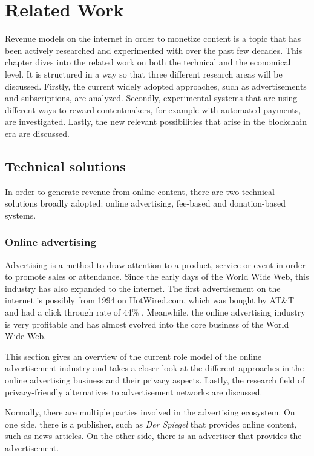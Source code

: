 \chapter{Related Work}
\label{cha:relatedwork}

Revenue models on the internet in order to monetize content is a topic that has been actively researched and experimented with over the past few decades. This chapter dives into the related work on both the technical and the economical level. It is structured in a way so that three different research areas will be discussed.
Firstly, the current widely adopted approaches, such as advertisements and subscriptions, are analyzed. Secondly, experimental systems that are using different ways to reward contentmakers, for example with automated payments, are investigated. Lastly, the new relevant possibilities that arise in the blockchain era are discussed.

\section{Technical solutions}

In order to generate revenue from online content, there are two technical solutions broadly adopted: online advertising, fee-based and donation-based systems.

\subsection{Online advertising}
Advertising is a method to draw attention to a product, service or event in order to promote sales or attendance. Since the early days of the World Wide Web, this industry has also expanded to the internet. The first advertisement on the internet is possibly from 1994 on HotWired.com, which was bought by AT\&T and had a click through rate of 44\% \cite{firstbanner}. Meanwhile, the online advertising industry is very profitable and has almost evolved into the core business of the World Wide Web.

This section gives an overview of the current role model of the online advertisement industry and takes a closer look at the different approaches in the online advertising business and their privacy aspects. Lastly, the research field of privacy-friendly alternatives to advertisement networks are discussed.

Normally, there are multiple parties involved in the advertising ecosystem. On one side, there is a publisher, such as \textit{Der Spiegel} that provides online content, such as news articles. On the other side, there is an advertiser that provides the advertisement.

